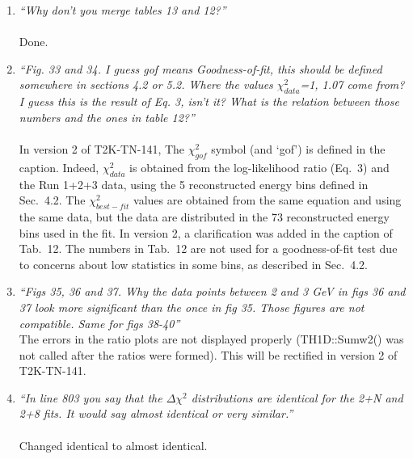 \begin{enumerate}
\vspace{5 mm}
\item
{\em
  ``Why don't you merge tables 13 and 12?''
}\\
\\
Done.

\vspace{5 mm}
\item
{\em
  ``Fig. 33 and 34. I guess gof means Goodness-of-fit, this should be defined somewhere in sections 4.2 or 5.2.  
    Where the values $\chi^{2}_{data}$=1, 1.07 come from? 
    I guess this is the result of Eq. 3, isn't it? 
    What is the relation between those numbers and the ones in table 12?''
}\\
\\
In version 2 of T2K-TN-141, The $\chi^{2}_{gof}$ symbol (and `gof') is defined in the caption.
Indeed, $\chi^{2}_{data}$ is obtained from the log-likelihood ratio (Eq.\ 3) and the Run 1+2+3 data, 
using the 5 reconstructed energy bins defined in Sec.\ 4.2.
The $\chi^{2}_{best-fit}$ values are obtained from the same equation and using the same data,
but the data are distributed in the 73 reconstructed energy bins used in the fit.
In version 2, a clarification was added in the caption of Tab.\ 12.
The numbers in Tab.\ 12 are not used for a goodness-of-fit test due to concerns about low statistics in 
some bins, as described in Sec.\ 4.2.

\vspace{5 mm}
\item
{\em
  ``Figs 35, 36 and 37. Why the data points between 2 and 3 GeV in figs 36 and 37 look more significant  
    than the once in fig 35. Those figures are not compatible.
    Same for figs 38-40''
}\\

The errors in the ratio plots are not displayed properly (TH1D::Sumw2() was not called after the
ratios were formed). This will be rectified in version 2 of T2K-TN-141. 

\vspace{5 mm}
\item
{\em
  ``In line 803 you say that the ${\Delta}{\chi}^{2}$ distributions are identical for the 2+N and 2+8 fits. 
    It would say almost identical or very similar.''
}\\
\\
Changed identical to almost identical.


\end{enumerate}
